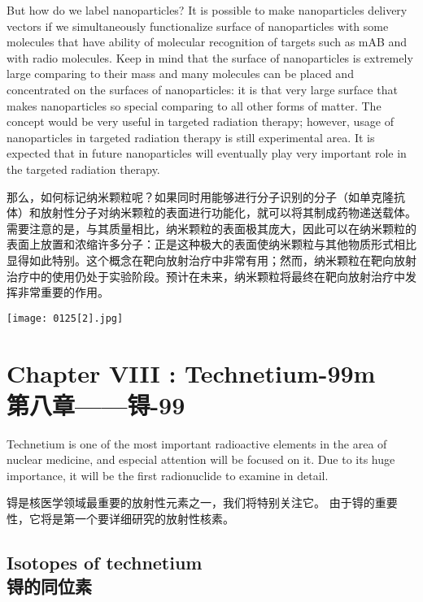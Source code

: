 \documentclass[dvipsnames, svgnames,a4paper,11pt]{article}
\begin{document}
But how do we label nanoparticles? It is possible
to make nanoparticles delivery vectors if we
simultaneously functionalize surface of
nanoparticles with some molecules that have
ability of molecular recognition of targets such as
mAB and with radio molecules. Keep in mind that
the surface of nanoparticles is extremely large
comparing to their mass and many molecules
can be placed and concentrated on the surfaces
of nanoparticles: it is that very large surface that
makes nanoparticles so special comparing to all
other forms of matter. The concept would be very
useful in targeted radiation therapy; however,
usage of nanoparticles in targeted radiation
therapy is still experimental area. It is expected
that in future nanoparticles will eventually play
very important role in the targeted radiation therapy.

那么，如何标记纳米颗粒呢？如果同时用能够进行分子识别的分子（如单克隆抗体）和放射性分子对纳米颗粒的表面进行功能化，就可以将其制成药物递送载体。需要注意的是，与其质量相比，纳米颗粒的表面极其庞大，因此可以在纳米颗粒的表面上放置和浓缩许多分子：正是这种极大的表面使纳米颗粒与其他物质形式相比显得如此特别。这个概念在靶向放射治疗中非常有用；然而，纳米颗粒在靶向放射治疗中的使用仍处于实验阶段。预计在未来，纳米颗粒将最终在靶向放射治疗中发挥非常重要的作用。

\begin{figure*}[h]
	\centering
    \texttt{[image: 0125[2].jpg]}    
\end{figure*}

\newpage

\section{Chapter VIII : Technetium-99m \\第八章——锝-99}

Technetium is one of the most important radioactive elements in the area of nuclear
medicine, and especial attention will be focused on it. Due to its huge importance, it
will be the first radionuclide to examine in detail.

锝是核医学领域最重要的放射性元素之一，我们将特别关注它。 由于锝的重要性，它将是第一个要详细研究的放射性核素。

\subsection{Isotopes of technetium \\锝的同位素}
\end{document}
